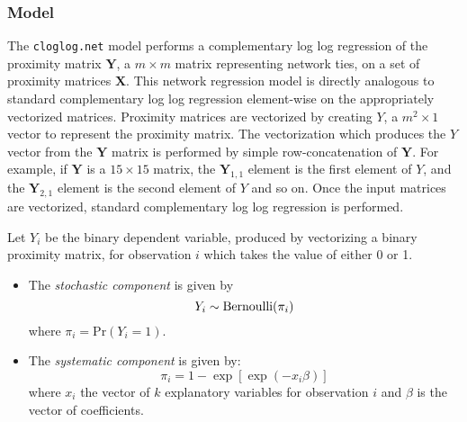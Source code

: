  
 
\subsubsection{Model} 
The {\tt cloglog.net} model performs a complementary log log regression of the proximity matrix $\mathbf{Y}$, a $m \times m$ matrix representing network ties, on a set of proximity matrices $\mathbf{X}$. This network regression model is directly analogous to standard complementary log log regression element-wise on the appropriately vectorized matrices. Proximity matrices are vectorized by creating $Y$, a $m^2 \times 1$ vector to represent the proximity matrix. The vectorization which produces the $Y$ vector from the $\mathbf{Y}$ matrix is performed by simple row-concatenation of $\mathbf{Y}$. For example, if $\mathbf{Y}$ is a $15 \times 15$ matrix, the $\mathbf{Y}_{1,1}$ element is the first element of $Y$, and the $\mathbf{Y}_{2,1}$ element is the second element of $Y$ and so on. Once the input matrices are vectorized, standard complementary log log regression is performed.  
 
Let $Y_{i}$ be the binary dependent variable, produced by vectorizing a binary proximity matrix, for observation $i$ which takes the value of either 0 or 1. 
\begin{itemize} 
\item The \emph{stochastic component} is given by  
\begin{equation*} 
Y_{i}  \sim \text{Bernoulli} ( \pi_{i})\\ 
\end{equation*} 
where $\pi_{i} = \text{Pr}(Y_{i} = 1)$. 
\item The \emph{systematic component} is given by: 
\begin{equation*} 
\pi_{i} = 1 - \exp[\exp (-x_i \beta)] 
\end{equation*} 
where $x_i$ the vector of $k$ explanatory variables for observation $i$ and $\beta$ is the vector of coefficients.  
\end{itemize} 
 
 
